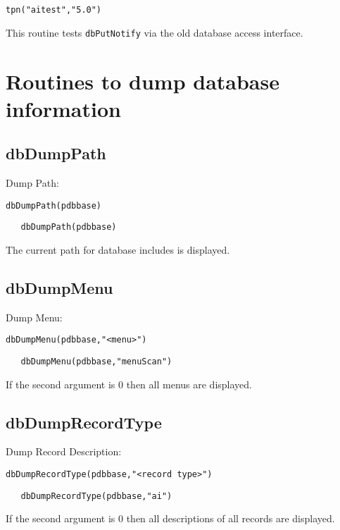 \begin{verbatim}tpn("aitest","5.0")
\end{verbatim}This routine tests \verb|dbPutNotify| via the old database access interface.

\section{Routines to dump database information}

\subsection{dbDumpPath}

Dump Path:

\begin{verbatim}dbDumpPath(pdbbase)
\end{verbatim}

\begin{verbatim}   dbDumpPath(pdbbase)
\end{verbatim}The current path for database includes is displayed.

\subsection{dbDumpMenu}

Dump Menu:

\begin{verbatim}dbDumpMenu(pdbbase,"<menu>")
\end{verbatim}

\begin{verbatim}   dbDumpMenu(pdbbase,"menuScan")
\end{verbatim}If the second argument is 0 then all menus are displayed.



\subsection{dbDumpRecordType}

Dump Record Description:

\begin{verbatim}dbDumpRecordType(pdbbase,"<record type>")
\end{verbatim}

\begin{verbatim}   dbDumpRecordType(pdbbase,"ai")
\end{verbatim}If the second argument is 0 then all descriptions of all records are displayed.


